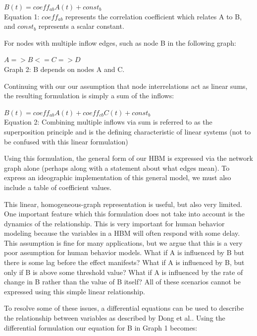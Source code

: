 \documentclass[conference]{IEEEtran}
\begin{document}
\begin{centering}
$B(t) = coeff_{ab}A(t) + const_b$\\
\small{Equation 1: $coeff_{ab}$ represents the correlation coefficient which relates A to B, and $const_b$ represents a scalar constant.}
\end{centering}

For nodes with multiple inflow edges, such as node B in the following graph:

\begin{centering}
$A => B <= C => D$\\
\small{Graph 2: B depends on nodes A and C.}
\end{centering}

Continuing with our our assumption that node interrelations act as linear sums, the resulting formulation is simply a sum of the inflows:

\begin{centering}
$B(t) = coeff_{ab}A(t) + coeff_{cb}C(t) + const_b$\\
\small{Equation 2: Combining multiple inflows via sum is referred to as the superposition principle and is the defining characteristic of linear systems (not to be confused with this linear formulation)}
\end{centering}

Using this formulation, the general form of our HBM is expressed via the network graph alone (perhaps along with a statement about what edges mean).
To express an ideographic implementation of this general model, we must also include a table of coefficient values. 

This linear, homogeneous-graph representation is useful, but also very limited.
One important feature which this formulation does not take into account is the dynamics of the relationship.
This is very important for human behavior modeling because the variables in a HBM will often respond with some delay.
This assumption is fine for many applications, but we argue that this is a very poor assumption for human behavior models. What if A is influenced by B but there is some lag before the effect manifests?
What if A is influenced by B, but only if B is above some threshold value? What if A is influenced by the rate of change in B rather than the value of B itself? All of these scenarios cannot be expressed using this simple linear relationship. 

To resolve some of these issues, a differential equations can be used to describe the relationship between variables as described by Dong et al.\cite{dong2012dynamical}. 
Using the differential formulation our equation for B in Graph 1 becomes:
\end{document}
